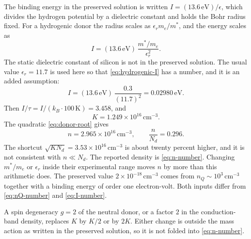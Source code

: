 The binding energy in the preserved solution is written \(I = (13.6\,\mathrm{eV})/\epsilon\), which divides the hydrogen potential by a dielectric constant and holds the Bohr radius fixed. For a hydrogenic donor the radius scales as \(\epsilon_r m_e/m^{\!*}\), and the energy scales as
\begin{equation}
\label{eq:hydrogenic-I}
I = (13.6\,\mathrm{eV})\, \frac{m^{\!*}/m_e}{\epsilon_r^{2}}.
\end{equation}
The static dielectric constant of silicon is not in the preserved solution. The usual value \(\epsilon_r = 11.7\) is used here so that \eqref{eq:hydrogenic-I} has a number, and it is an added assumption:
\begin{equation}
\label{eq:I-number}
I = (13.6\,\mathrm{eV})\, \frac{0.3}{(11.7)^2} = 0.02980\,\mathrm{eV}.
\end{equation}
Then \(I/\tau = I/(k_B\cdot 100\,\mathrm{K}) = 3.458\), and
\begin{equation}
\label{eq:K-number}
K = 1.249\times 10^{16}\,\mathrm{cm}^{-3}.
\end{equation}
The quadratic \eqref{eq:donor-root} gives
\begin{equation}
\label{eq:n-number}
n = 2.965\times 10^{16}\,\mathrm{cm}^{-3},
\qquad
\frac{n}{N_d} = 0.296.
\end{equation}
The shortcut \(\sqrt{K N_d} = 3.53\times 10^{16}\,\mathrm{cm}^{-3}\) is about twenty percent higher, and it is not consistent with \(n\ll N_d\). The reported density is \eqref{eq:n-number}. Changing \(m^{\!*}/m_e\) or \(\epsilon_r\) inside their experimental range moves \(n\) by more than this arithmetic does. The preserved value \(2\times 10^{-18}\,\mathrm{cm}^{-3}\) comes from \(n_Q\sim 10^{3}\,\mathrm{cm}^{-3}\) together with a binding energy of order one electron-volt. Both inputs differ from \eqref{eq:nQ-number} and \eqref{eq:I-number}.

A spin degeneracy \(g=2\) of the neutral donor, or a factor \(2\) in the conduction-band density, replaces \(K\) by \(K/2\) or by \(2K\). Either change is outside the mass action as written in the preserved solution, so it is not folded into \eqref{eq:n-number}.
